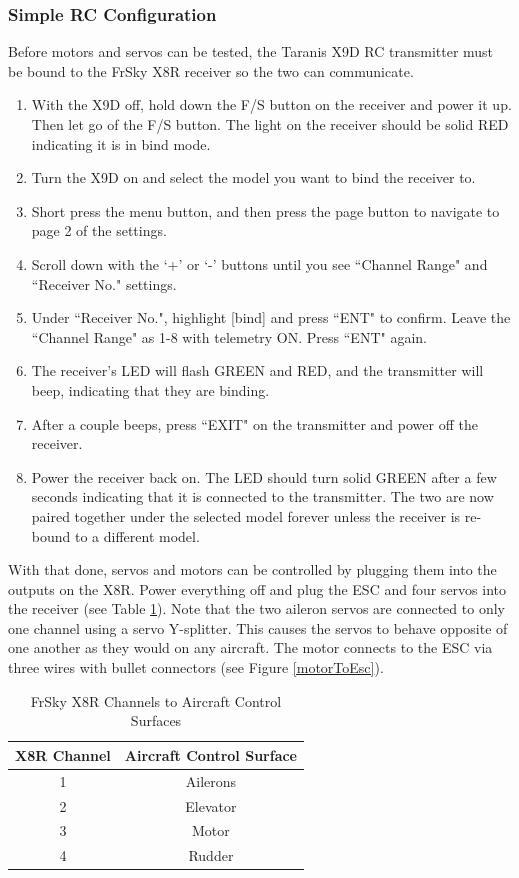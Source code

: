 \documentclass[12pt,journal,compsoc]{IEEEtran}
\begin{document}
\subsubsection{Simple RC Configuration}
Before motors and servos can be tested, the Taranis X9D RC transmitter must be bound to the FrSky X8R receiver so the two can communicate.
\begin{enumerate}
\item With the X9D off, hold down the F/S button on the receiver and power it up. Then let go of the F/S button. The light on the receiver should be solid RED indicating it is in bind mode.
\item Turn the X9D on and select the model you want to bind the receiver to.
\item Short press the menu button, and then press the page button to navigate to page 2 of the settings.
\item Scroll down with the `+' or `-' buttons until you see ``Channel Range" and ``Receiver No." settings.
\item Under ``Receiver No.", highlight [bind] and press ``ENT" to confirm. Leave the ``Channel Range" as 1-8 with telemetry ON. Press ``ENT" again.
\item The receiver's LED will flash GREEN and RED, and the transmitter will beep, indicating that they are binding.
\item After a couple beeps, press ``EXIT" on the transmitter and power off the receiver.
\item Power the receiver back on. The LED should turn solid GREEN after a few seconds indicating that it is connected to the transmitter. The two are now paired together under the selected model forever unless the receiver is re-bound to a different model.
\end{enumerate}

With that done, servos and motors can be controlled by plugging them into the outputs on the X8R. Power everything off and plug the ESC and four servos into the receiver (see Table \ref{x8rChannels}). Note that the two aileron servos are connected to only one channel using a servo Y-splitter. This causes the servos to behave opposite of one another as they would on any aircraft. The motor connects to the ESC via three wires with bullet connectors (see Figure \ref{motorToEsc}).
\begin{table}[h!]
\caption{FrSky X8R Channels to Aircraft Control Surfaces}
\centering
\begin{tabular}{|c|c|}
\hline
X8R Channel & Aircraft Control Surface \\
\hline
1 & Ailerons \\
\hline
2 & Elevator \\
\hline
3 & Motor \\
\hline
4 & Rudder\\
\hline
\end{tabular}
\label{x8rChannels}
\end{table}
\end{document}
